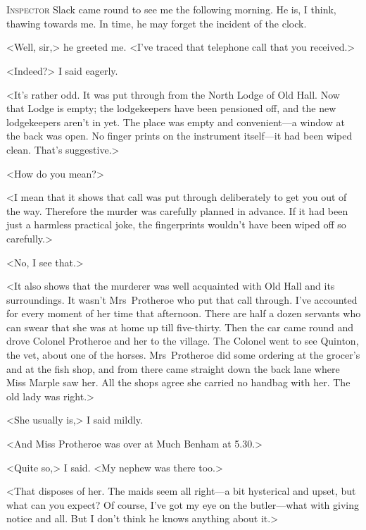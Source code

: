\chapter[Chapter  \thechapter]{}


\lettrine{I}{nspector} Slack came round to see me the following morning. He is, I think, thawing towards me. In time, he may forget the incident of the clock.

\zz
<Well, sir,> he greeted me. <I've traced that telephone call that you received.>

<Indeed?> I said eagerly.

<It's rather odd. It was put through from the North Lodge of Old Hall. Now that Lodge is empty; the lodgekeepers have been pensioned off, and the new lodgekeepers aren't in yet. The place was empty and convenient—a window at the back was open. No finger prints on the instrument itself—it had been wiped clean. That's suggestive.>

<How do you mean?>

<I mean that it shows that call was put through deliberately to get you out of the way. Therefore the murder was carefully planned in advance. If it had been just a harmless practical joke, the fingerprints wouldn't have been wiped off so carefully.>

<No, I see that.>

<It also shows that the murderer was well acquainted with Old Hall and its surroundings. It wasn't Mrs~Protheroe who put that call through. I've accounted for every moment of her time that afternoon. There are half a dozen servants who can swear that she was at home up till five-thirty. Then the car came round and drove Colonel Protheroe and her to the village. The Colonel went to see Quinton, the vet, about one of the horses. Mrs~Protheroe did some ordering at the grocer's and at the fish shop, and from there came straight down the back lane where Miss Marple saw her. All the shops agree she carried no handbag with her. The old lady was right.>

<She usually is,> I said mildly.

<And Miss Protheroe was over at Much Benham at 5.30.>

<Quite so,> I said. <My nephew was there too.>

<That disposes of her. The maids seem all right—a bit hysterical and upset, but what can you expect? Of course, I've got my eye on the butler—what with giving notice and all. But I don't think he knows anything about it.>

